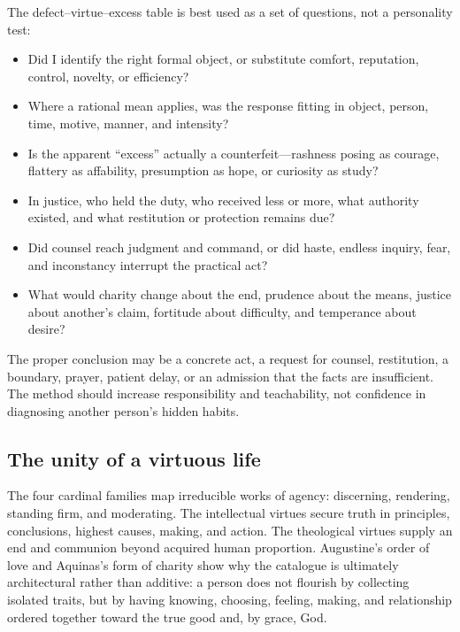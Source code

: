 The defect--virtue--excess table is best used as a set of questions, not a personality test:

\begin{itemize}[leftmargin=1.4em,itemsep=0.25em]
  \item Did I identify the right formal object, or substitute comfort, reputation, control, novelty, or efficiency?
  \item Where a rational mean applies, was the response fitting in object, person, time, motive, manner, and intensity?
  \item Is the apparent ``excess'' actually a counterfeit---rashness posing as courage, flattery as affability, presumption as hope, or curiosity as study?
  \item In justice, who held the duty, who received less or more, what authority existed, and what restitution or protection remains due?
  \item Did counsel reach judgment and command, or did haste, endless inquiry, fear, and inconstancy interrupt the practical act?
  \item What would charity change about the end, prudence about the means, justice about another's claim, fortitude about difficulty, and temperance about desire?
\end{itemize}

The proper conclusion may be a concrete act, a request for counsel, restitution, a boundary, prayer, patient delay, or an admission that the facts are insufficient. The method should increase responsibility and teachability, not confidence in diagnosing another person's hidden habits.

\subsection{The unity of a virtuous life}

The four cardinal families map irreducible works of agency: discerning, rendering, standing firm, and moderating. The intellectual virtues secure truth in principles, conclusions, highest causes, making, and action. The theological virtues supply an end and communion beyond acquired human proportion. Augustine's order of love and Aquinas's form of charity show why the catalogue is ultimately architectural rather than additive: a person does not flourish by collecting isolated traits, but by having knowing, choosing, feeling, making, and relationship ordered together toward the true good and, by grace, God.
